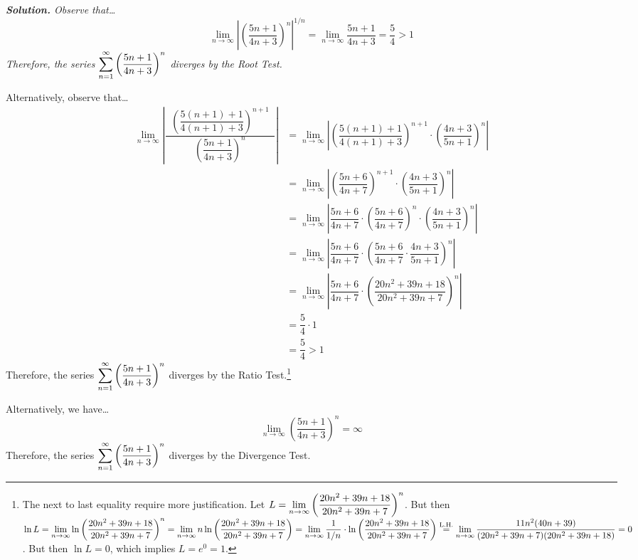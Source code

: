 \documentclass[12pt,letterpaper]{exam}
\begin{document}
\begin{questions}
{\small\itshape \textbf{Solution.} Observe that\dots
	\[
	\lim_{n \to \infty} \left| \left( \dfrac{5n + 1}{4n + 3} \right)^n \right|^{1/n}= \lim_{n \to \infty} \dfrac{5n + 1}{4n + 3}= \dfrac{5}{4} > 1
	\]
Therefore, the series $\displaystyle\sum_{n=1}^\infty \left( \dfrac{5n + 1}{4n + 3} \right)^n$ diverges by the Root Test. \pspace

Alternatively, observe that\dots
	\[
	\begin{aligned}
	\lim_{n \to \infty} \left| \dfrac{\;\;\left( \dfrac{5(n+1) + 1}{4(n+1) + 3} \right)^{n+1}\;\;}{\left( \dfrac{5n + 1}{4n + 3} \right)^n} \right|&= \lim_{n \to \infty} \left| \left( \dfrac{5(n+1) + 1}{4(n+1) + 3} \right)^{n+1} \cdot \left( \dfrac{4n + 3}{5n + 1} \right)^n \right| \\
	&= \lim_{n \to \infty} \left| \left( \dfrac{5n + 6}{4n + 7} \right)^{n+1} \cdot \left( \dfrac{4n + 3}{5n + 1} \right)^n \right| \\
	&= \lim_{n \to \infty} \left| \dfrac{5n + 6}{4n + 7} \cdot \left( \dfrac{5n + 6}{4n + 7} \right)^n \cdot \left( \dfrac{4n + 3}{5n + 1} \right)^n \right| \\
	&= \lim_{n \to \infty} \left| \dfrac{5n + 6}{4n + 7} \cdot \left( \dfrac{5n + 6}{4n + 7} \cdot \dfrac{4n + 3}{5n + 1} \right)^n \right| \\
	&= \lim_{n \to \infty} \left| \dfrac{5n + 6}{4n + 7} \cdot \left( \dfrac{20n^2 + 39n + 18}{20n^2 + 39n + 7} \right)^n \right| \\
	&= \dfrac{5}{4} \cdot 1 \\
	&= \dfrac{5}{4} > 1
	\end{aligned}
	\]
Therefore, the series $\displaystyle\sum_{n=1}^\infty \left( \dfrac{5n + 1}{4n + 3} \right)^n$ diverges by the Ratio Test.\footnote{The next to last equality require more justification. Let $\displaystyle L= \lim_{n \to \infty} \left( \dfrac{20n^2 + 39n + 18}{20n^2 + 39n + 7} \right)^n$. But then $\displaystyle \ln L= \lim_{n \to \infty} \ln \left( \dfrac{20n^2 + 39n + 18}{20n^2 + 39n + 7} \right)^n= \lim_{n \to \infty} n\ln \left( \dfrac{20n^2 + 39n + 18}{20n^2 + 39n + 7} \right)= \lim_{n \to \infty} \dfrac{1}{1/n} \cdot \ln \left( \dfrac{20n^2 + 39n + 18}{20n^2 + 39n + 7} \right) \stackrel{\text{L.H.}}{=} \lim_{n \to \infty} \dfrac{11n^2 (40n + 39)}{(20n^2 + 39n + 7)(20n^2 + 39n + 18)}= 0$. But then $\ln L= 0$, which implies $L= e^0= 1$.}

Alternatively, we have\dots
	\[
	\lim_{n \to \infty} \left( \dfrac{5n + 1}{4n + 3} \right)^n= \infty
	\]
Therefore, the series $\displaystyle\sum_{n=1}^\infty \left( \dfrac{5n + 1}{4n + 3} \right)^n$ diverges by the Divergence Test.}




\end{questions}
\end{document}
